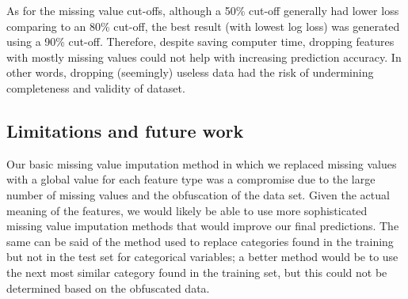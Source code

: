 \documentclass{article}\usepackage[]{graphicx}\usepackage[]{color}
\begin{document}
As for the missing value cut-offs, although a 50\% cut-off generally had lower loss comparing to an 80\% cut-off, the best result (with lowest log loss) was generated using a 90\% cut-off. Therefore, despite saving computer time, dropping features with mostly missing values could not help with increasing prediction accuracy. In other words, dropping (seemingly) useless data had the risk of undermining completeness and validity of dataset.

\subsection{Limitations and future work}
                                                                                                                                                                                                                                                                                                                                                                                                                                                                                                                                                                                                Our basic missing value imputation method in which we replaced missing values with a global value for each feature type was a compromise due to the large number of missing values and the obfuscation of the data set. Given the actual meaning of the features, we would likely be able to use more sophisticated missing value imputation methods that would improve our final predictions. The same can be said of the method used to replace categories found in the training but not in the test set for categorical variables; a better method would be to use the next most similar category found in the training set, but this could not be determined based on the obfuscated data.
                                                                                                                                                                                                                                                                                                                                                                                                                                                                                                                                                                                                
\end{document}
